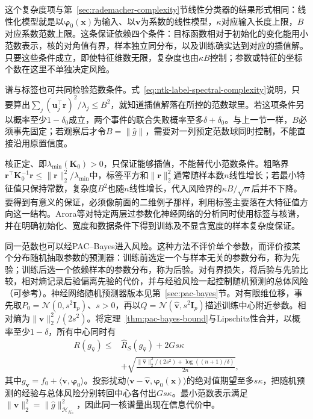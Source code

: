 这个复杂度项与第~\ref{sec:rademacher-complexity}节线性分类器的结果形式相同：线性化模型就是以$\bm\varphi_0(\bm x)$为输入、以$\bm v$为系数的线性模型，$\kappa$对应输入长度上限，$B$对应系数范数上限。这条保证依赖四个条件：目标函数相对于初始化的变化能用小范数表示，核的对角值有界，样本独立同分布，以及训练确实达到对应的插值解。只要这些条件成立，即使特征维数无限，复杂度也由$\kappa B$控制；参数或特征的坐标个数在这里不单独决定风险。

谱与标签也可共同检验范数条件。式~\eqref{eq:ntk-label-spectral-complexity}说明，只要算出$\sum_j(\bm u_j^\top\bm r)^2/\lambda_j\leq B^2$，就知道插值解落在所控的范数球里。若这项条件另以概率至少$1-\delta_0$成立，两个事件的联合失败概率至多$\delta+\delta_0$。与上一节一样，$B$必须事先固定；若观察后才令$B=\|\widehat g\|$，需要对一列预定范数球同时控制，不能直接沿用原置信度。

核正定、即$\lambda_{\min}(\bm K_0)>0$，只保证能够插值，不能替代小范数条件。粗略界$\bm r^\top\bm K_0^{-1}\bm r\leq\|\bm r\|_2^2/\lambda_{\min}$中，标签平方和$\|\bm r\|_2^2$通常随样本数$n$线性增长；若最小特征值只保持常数，复杂度$B^2$也随$n$线性增长，代入风险界的$\kappa B/\sqrt n$后并不下降。要得到有意义的保证，必须像前面的二维例子那样，利用标签主要落在大特征值方向这一结构。Arora等对特定两层过参数化神经网络的分析同时使用标签与核谱，并在明确初始化、宽度和数据条件下得到训练及不显含宽度的样本复杂度保证。

同一范数也可以经PAC--Bayes进入风险。这种方法不评价单个参数，而评价按某个分布随机抽取参数的预测器：训练前选定一个与样本无关的参数分布，称为先验；训练后选一个依赖样本的参数分布，称为后验。对有界损失，将后验与先验比较，相对熵记录后验偏离先验的代价，并与经验风险一起控制随机预测的总体风险（可参考）。神经网络随机预测器版本见第~\ref{sec:pac-bayes}节。对有限维位移，事先取$P_0=\mathcal N(0,s^2\bm I_p)$、$s>0$，再以$Q=\mathcal N(\widehat{\bm v},s^2\bm I_p)$描述训练中心附近参数。相对熵为$\|\widehat{\bm v}\|_2^2/(2s^2)$。将定理~\ref{thm:pac-bayes-bound}与Lipschitz性合并，以概率至少$1-\delta$，所有中心同时有
\begin{equation}
 \begin{aligned}
 R(g_{\widehat{\bm v}})\leq{}&\hat R_S(g_{\widehat{\bm v}})+2Gs\kappa\\
 &+\sqrt{\frac{\|\widehat{\bm v}\|_2^2/(2s^2)+\log((n+1)/\delta)}{2n}},
 \end{aligned}
 \label{eq:ntk-pac-bayes-risk}
\end{equation}
其中$g_{\bm v}=f_0+\langle\bm v,\bm\varphi_0\rangle$。投影扰动$\langle\bm v-\widehat{\bm v},\bm\varphi_0(\bm x)\rangle$的绝对值期望至多$s\kappa$，把随机预测的经验与总体风险分别转回中心各付出$Gs\kappa$。最小范数表示满足$\|\widehat{\bm v}\|_2^2=\|\widehat g\|_{\mathcal H_{K_0}}^2$，因此同一核谱量出现在信息代价中。

